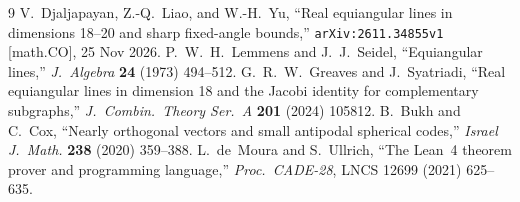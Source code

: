 \documentclass[10pt,twocolumn]{article}
\begin{document}
\begin{thebibliography}{9}
 V.~Djaljapayan, Z.-Q.~Liao, and W.-H.~Yu, ``Real equiangular lines in dimensions 18--20 and sharp fixed-angle bounds,'' \texttt{arXiv:2611.34855v1} [math.CO], 25 Nov 2026.
 P.~W.~H.~Lemmens and J.~J.~Seidel, ``Equiangular lines,'' \textit{J.\ Algebra} \textbf{24} (1973) 494--512.
 G.~R.~W.~Greaves and J.~Syatriadi, ``Real equiangular lines in dimension 18 and the Jacobi identity for complementary subgraphs,'' \textit{J.\ Combin.\ Theory Ser.\ A} \textbf{201} (2024) 105812.
 B.~Bukh and C.~Cox, ``Nearly orthogonal vectors and small antipodal spherical codes,'' \textit{Israel J.\ Math.} \textbf{238} (2020) 359--388.
 L.~de~Moura and S.~Ullrich, ``The Lean~4 theorem prover and programming language,'' \textit{Proc.\ CADE-28}, LNCS 12699 (2021) 625--635.
\end{thebibliography}
\end{document}
